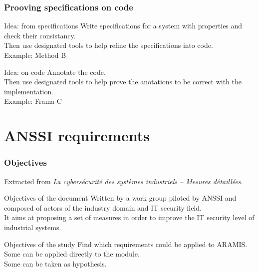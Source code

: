 \documentclass{beamer}
\begin{document}
\begin{frame}
    \frametitle{Prooving specifications on code}

    \begin{block}{Idea: from specifications}
        Write specifications for a system with properties and check their consistancy.\\
        Then use designated tools to help refine the specifications into code.\\
        \medskip
        Example: Method B
    \end{block}
    \vfill
    \begin{block}{Idea: on code}
        Annotate the code.\\
        Then use designated tools to help prove the anotations to be correct with the implementation.\\
        \medskip
        Example: Frama-C
    \end{block}
    \vfill
\end{frame}

\section{ANSSI requirements}

\begin{frame}
    \tableofcontents[currentsection]
\end{frame}

\begin{frame}
    \frametitle{Objectives}

    Extracted from {\em La cybers\'ecurit\'e des syst\`emes industriels -- Mesures d\'etaill\'ees}.
    \vfill
    \begin{block}{Objectives of the document}
        Written by a work group piloted by ANSSI and composed of actors of the industry domain and IT security field.\\
        \medskip
        It aims at proposing a set of measures in order to improve the IT security level of industrial systems.
    \end{block}
    \vfill
    \begin{block}{Objectives of the study}
        Find which requirements could be applied to ARAMIS.\\
        \medskip
        Some can be applied directly to the module.\\
        Some can be taken as hypothesis.
    \end{block}
\end{frame}
\end{document}
